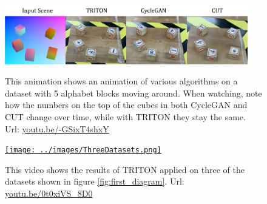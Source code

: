 		\begin{figure}[H]
			\begin{center}
			\href{https://youtu.be/0t0xiVS_8D0}{
					\includegraphics[width=300pt]{../images/algo_comparison_thumbnail.pdf}
					}
				\end{center}
			\caption{
				This animation shows an animation of various algorithms on a dataset with 5 alphabet blocks moving around. 
				When watching, note how the numbers on the top of the cubes in both CycleGAN and CUT change over time, while with TRITON they stay the same.
				Url: \href{https://youtu.be/-GSixT4shxY}{youtu.be/-GSixT4shxY}
			}
			\label{fig:algocomparisonvideo}
		\end{figure}



		\begin{figure}[H]
			\begin{center}
			\href{https://youtu.be/0t0xiVS_8D0}{
					\texttt{[image: ../images/ThreeDatasets.png]}
					}
				\end{center}
			\caption{
				This video shows the results of TRITON applied on three of the datasets shown in figure \ref{fig:first_diagram}.
				Url: \href{https://youtu.be/0t0xiVS_8D0}{youtu.be/0t0xiVS\_8D0}
			}
			\label{fig:algocomparisonvideo}
		\end{figure}



	

	



